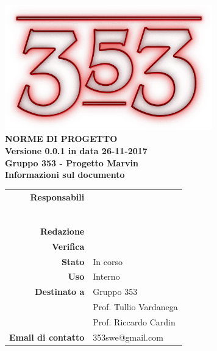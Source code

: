 \documentclass[openany, a4paper, 12pt]{report}
\begin{document}
\begin{titlepage}
	\centering
	\vfill
	{
		\bfseries
		\vskip2cm
		\includegraphics[width=9cm]{../../common/images/logo.png} \\
		\vfill
		\Huge{NORME DI PROGETTO}\\
		\vfill
		\Large Versione 0.0.1 in data 26-11-2017\\
		\large Gruppo 353 - Progetto Marvin\\
		\vfill
		\normalsize Informazioni sul documento\\
		\begin{table}[htbp]
			\centering
			\renewcommand\arraystretch{1.2}
			\begin{tabular}{r|l}
				\hline
				\textbf{Responsabili}	& \Elena\\
										& \Valentina\\
										& \Mirco\\
										& \Riccardo\\
										& \Gianluca\\
										& \Parwinder\\
										& \Davide\\
				
				\textbf{Redazione} 	& \\
				\textbf{Verifica} 	& \\	
				
				\textbf{Stato} 			& In corso\\
				\textbf{Uso}			& Interno\\
				\textbf{Destinato a}   	& Gruppo 353\\
				& Prof. Tullio Vardanega\\
				& Prof. Riccardo Cardin\\
				
				\textbf{Email di contatto}	& 353swe@gmail.com
			\end{tabular}
		\end{table}
		\vfill
	}    
\end{titlepage}

\tableofcontents
\newpage
{}




 
\end{document}
